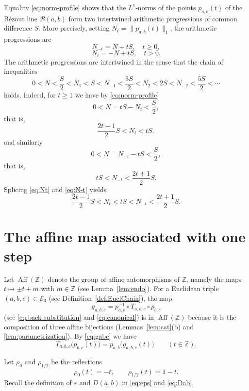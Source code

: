 \documentclass[12pt,letterpaper]{article}
\numberwithin{equation}{section}
\newcommand{\Z}{\mathbb Z}
\newcommand{\B}{\mathcal B}
\newcommand{\E}{\mathcal E}
\newcommand{\Aff}{\operatorname{Aff}}
\newcommand{\eps}{\varepsilon}
\newcommand{\normone}[1]{\lVert #1\rVert_1}
\theoremstyle{plain}
\theoremstyle{definition}
\begin{document}
Equality \eqref{eq:norm-profile} shows that the $L^1$-norms of the points $p_{a,b}(t)$ of the Bézout line $\B(a,b)$ form two intertwined arithmetic progressions of common difference $S$. More precisely, setting $N_t=\normone{p_{a,b}(t)}$, the arithmetic progressions are
\[
N_{-t}=N+tS,\quad t\ge0,
\]
\[
N_t=-N+tS,\quad t>0.
\]
The arithmetic progressions are intertwined in the sense that the chain of inequalities
\[
0<N<\frac{S}{2}<N_1<S<N_{-1}<\frac{3S}{2}<N_2<2S<N_{-2}<\frac{5S}{2}<\cdots
\]
holds. Indeed, for $t\ge1$ we have by \eqref{eq:norm-profile}
\[
 0<N=tS-N_t<\frac{S}{2},
\]
that is,
\begin{equation}\label{eq:Nt}
 \frac{2t-1}{2}S<N_t<tS,
\end{equation}
and similarly
\[
 0<N=N_{-t}-tS<\frac{S}{2},
\]
that is,
\begin{equation}\label{eq:N-t}
 tS<N_{-t}<\frac{2t+1}{2}S.
\end{equation}
Splicing \eqref{eq:Nt} and \eqref{eq:N-t} yields
\[
 \frac{2t-1}{2}S<N_t<tS<N_{-t}<\frac{2t+1}{2}S.
\]

\section{The affine map associated with one step}

Let $\Aff(\Z)$ denote the group of affine automorphisms of $\Z$, namely the maps $t\mapsto\pm t+m$ with $m\in\Z$ (see Lemma~\ref{lem:endo}). For a Euclidean triple $(a,b,c)\in\E_3$ (see Definition~\ref{def:EuclChain}), the map
\begin{equation}\label{eq:gabc}
 g_{a,b,c}
 =p_{a,b}^{-1}\circ T_{a,b,c}\circ p_{b,c}
\end{equation}
(see \eqref{eq:back-substitution} and \eqref{eq:canonical}) is in $\Aff(\Z)$ because it is the composition of three affine bijections (Lemmas~\ref{lem:cat}(b) and \ref{lem:parametrization}). By \eqref{eq:gabc} we have
\begin{equation}\label{eq:local-map}
 T_{a,b,c}\bigl(p_{b,c}(t)\bigr)
 =p_{a,b}\bigl(g_{a,b,c}(t)\bigr)
 \qquad(t\in\Z).
\end{equation}

Let $\rho_0$ and $\rho_{1/2}$ be the reflections
\[
 \rho_0(t)=-t,
 \qquad
 \rho_{1/2}(t)=1-t.
\]
Recall the definition of $\eps$ and $D(a,b)$ in \eqref{eq:eps} and \eqref{eq:Dab}.
\end{document}
